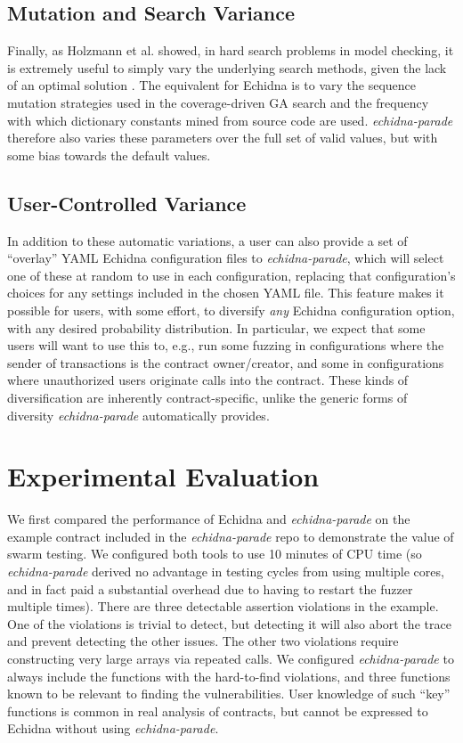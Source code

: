 \documentclass[sigconf]{acmart}
\begin{document}
{\subsection{Mutation and Search Variance}

Finally, as Holzmann et al. showed, in hard search problems in model
checking, it is extremely useful to simply vary the underlying search
methods, given the lack of an optimal solution \cite{swarmIEEE}.  The
equivalent for Echidna is to vary the sequence mutation strategies
used in the coverage-driven GA search and the frequency with which
dictionary constants mined from source code are used.
\emph{echidna-parade} therefore also varies these parameters over the
full set of valid values, but with some bias towards the default values.

\subsection{User-Controlled Variance}

In addition to these automatic variations, a user can also provide a
set of ``overlay'' YAML Echidna configuration files to
\emph{echidna-parade}, which will select one of these at random to use
in each configuration, replacing that configuration's choices for any
settings included in the chosen YAML file.  This feature makes it possible for users, with some effort, to diversify \emph{any} Echidna configuration option, with any desired probability distribution.  In particular, we expect that some users will want to use this to, e.g.,  run some fuzzing in configurations where the sender of transactions is the contract owner/creator, and some in configurations where unauthorized users originate calls into the contract.  These kinds of diversification are inherently contract-specific, unlike the generic forms of diversity \emph{echidna-parade} automatically provides.

\section{Experimental Evaluation}

We first compared the performance of Echidna and \emph{echidna-parade} on the example contract included in the \emph{echidna-parade} repo to demonstrate the value of swarm testing.  We configured both tools to use 10 minutes of CPU time (so \emph{echidna-parade} derived no advantage in testing cycles from using multiple cores, and in fact paid a substantial overhead due to having to restart the fuzzer multiple times).  There are three detectable assertion violations in the example.  One of the violations is trivial to detect, but detecting it will also abort the trace and prevent detecting the other issues.  The other two violations require constructing very large arrays via repeated calls.  We configured \emph{echidna-parade} to always include the functions with the hard-to-find violations, and three functions known to be relevant to finding the vulnerabilities.  User knowledge of such ``key'' functions is common in real analysis of contracts, but cannot be expressed to Echidna without using \emph{echidna-parade}.

}
\end{document}
